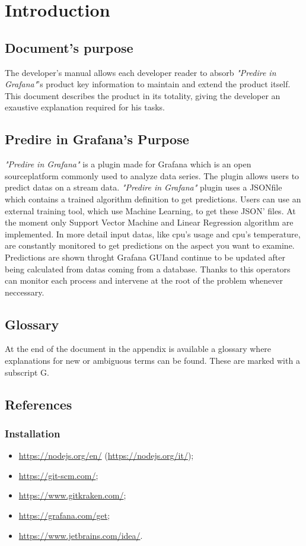 \section{Introduction}
	\subsection{Document's purpose}
The developer's manual allows each developer reader to absorb \emph{"Predire in Grafana\glo"}'s product key information to maintain and extend the product itself.
This document describes the product in its totality, giving the developer an exaustive explanation required for his tasks.
	
\subsection{Predire in Grafana’s Purpose}
\emph{"Predire in Grafana"} is a plugin made for Grafana which is an open source\glo platform commonly used to analyze data series. The plugin allows users to predict datas on a stream data. \emph{"Predire in Grafana"} plugin uses a JSON\glo file which contains a trained algorithm definition to get predictions. Users can use an external training tool, which use Machine Learning\glo , to get these JSON' files. At the moment only Support Vector Machine and Linear Regression algorithm are implemented. In more detail input datas, like cpu's usage and cpu's temperature, are constantly monitored to get predictions on the aspect you want to examine. Predictions are shown throght Grafana GUI\glo and continue to be updated after being calculated from datas coming from a database. Thanks to this operators can monitor each process and intervene at the root of the problem whenever neccessary.


\subsection{Glossary}
At the end of the document in the appendix is available a glossary where explanations for new or ambiguous terms can be found. These are marked with a subscript G.

\subsection{References}
\subsubsection{Installation}
\begin{itemize}
	\item \url{https://nodejs.org/en/} (\url{https://nodejs.org/it/});
	\item \url{https://git-scm.com/};
	\item \url{https://www.gitkraken.com/};
	\item \url{https://grafana.com/get};
	\item \url{https://www.jetbrains.com/idea/}.
\end{itemize}
